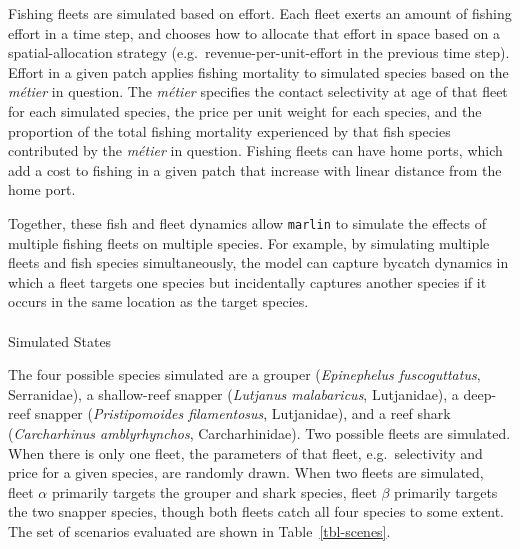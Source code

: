 \documentclass[
  default,
  lineno,
  referee]{sn-jnl}
\makeatletter
\let\oldparagraph\paragraph
\renewcommand{\paragraph}{
    \@ifstar
      \xxxParagraphStar
      \xxxParagraphNoStar
  }
\newcommand{\xxxParagraphStar}[1]{\oldparagraph*{#1}\mbox{}}
\newcommand{\xxxParagraphNoStar}[1]{\oldparagraph{#1}\mbox{}}
\makeatother
\begin{document}
Fishing fleets are simulated based on effort. Each fleet exerts an
amount of fishing effort in a time step, and chooses how to allocate
that effort in space based on a spatial-allocation strategy
(e.g.~revenue-per-unit-effort in the previous time step). Effort in a
given patch applies fishing mortality to simulated species based on the
\emph{métier} in question. The \emph{métier} specifies the contact
selectivity at age of that fleet for each simulated species, the price
per unit weight for each species, and the proportion of the total
fishing mortality experienced by that fish species contributed by the
\emph{métier} in question. Fishing fleets can have home ports, which add
a cost to fishing in a given patch that increase with linear distance
from the home port.

Together, these fish and fleet dynamics allow \texttt{marlin} to
simulate the effects of multiple fishing fleets on multiple species. For
example, by simulating multiple fleets and fish species simultaneously,
the model can capture bycatch dynamics in which a fleet targets one
species but incidentally captures another species if it occurs in the
same location as the target species.

\paragraph{Simulated States}\label{simulated-states}

The four possible species simulated are a grouper (\emph{Epinephelus
fuscoguttatus}, Serranidae), a shallow-reef snapper (\emph{Lutjanus
malabaricus}, Lutjanidae), a deep-reef snapper (\emph{Pristipomoides
filamentosus}, Lutjanidae), and a reef shark (\emph{Carcharhinus
amblyrhynchos}, Carcharhinidae). Two possible fleets are simulated. When
there is only one fleet, the parameters of that fleet, e.g.~selectivity
and price for a given species, are randomly drawn. When two fleets are
simulated, fleet \(\alpha\) primarily targets the grouper and shark
species, fleet \(\beta\) primarily targets the two snapper species,
though both fleets catch all four species to some extent. The set of
scenarios evaluated are shown in Table~\ref{tbl-scenes}.
\end{document}
